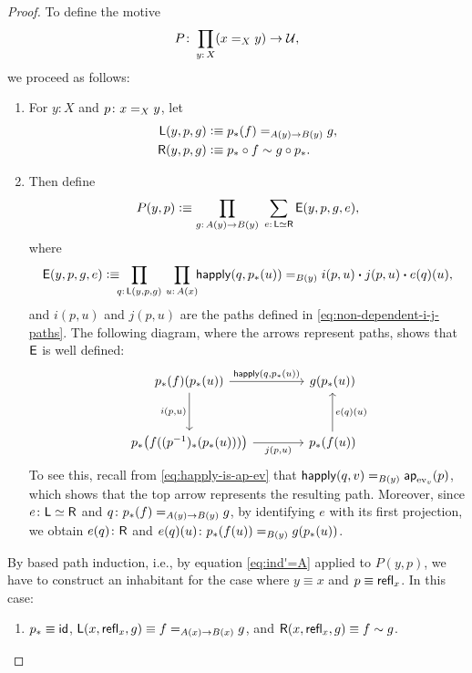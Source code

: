 \begin{proof}
    To define the motive
    \[
        P\colon\prod_{y\colon X}(x\eq Xy)\to\univ,
    \]
    we proceed as follows:
    \begin{enumerate}[-]
        \item For $y\colon X$ and $p\colon x\eq Xy$, let
        \begin{align*}
            \mathsf{L}(y,p,g)
                &\mathrel{\vcentcolon}\equiv p_*(f)\mathrel{=_{A(y)\to B(y)}}g,\\
            \mathsf{R}(y,p,g)
                &\mathrel{\vcentcolon}\equiv p_*\circ f\sim g\circ p_*.
        \end{align*}

        \item Then define
        \[
            P(y,p)\defeq\prod_{g\colon A(y)\to B(y)}
                \;\sum_{e\colon \fun L\simeq\fun R}
                \fun E(y,p,g,e),
        \]
        where
        \[
            \fun E(y,p,g,e)\defeq\!\!\!
                \prod_{q\colon\fun L(y,p,g)}
                \,\prod_{u\colon A(x)}
                    \!\!\fun{happly}(q,p_*(u))
                    \eq{B(y)}
                    i(p,u)\ct j(p, u)\ct e(q)(u),
        \]
        and $i(p,u)$ and $j(p,u)$ are the paths defined in \eqref{eq:non-dependent-i-j-paths}. The following diagram, where the arrows represent paths, shows that $\mathsf{E}$ is well defined:
        \[
            \begin{tikzcd}[column sep=4em, row sep=3em]
                p_*(f)(p_*(u))
                        \arrow[r,"{\fun{happly}(q, p_*(u))}"]
                        \arrow[d,"{i(p,u)}"']
                    &g(p_*(u))\\
                {p_*\bigl(f((p^{-1})_*(p_*(u)))\bigr)}
                        \arrow[r,"{j(p,u)}"']
                    &{p_*(f(u))}
                        \arrow[u,"e(q)(u)"']
            \end{tikzcd}
        \]
        To see this, recall from \eqref{eq:happly-is-ap-ev} that $\mathsf{happly}(q,v)\mathrel{=_{B(y)}}\mathsf{ap}_{{\operatorname{ev}}_{v}}(p)$, which shows that the top arrow represents the resulting path. Moreover, since $e\colon\fun L\simeq\fun R$ and $q\colon p_*(f)\eq{A(y)\to B(y)}g$, by identifying $e$ with its first projection, we obtain $e(q)\colon\fun R$ and $e(q)(u)\colon p_*(f(u))\eq{B(y)}g(p_*(u))$.
    \end{enumerate}
    By based path induction, i.e., by equation \eqref{eq:ind'=A} applied to $P(y,p)$, we have to construct an inhabitant for the case where $y\equiv x$ and $p\equiv\mathsf{refl}_x$. In this case:
    \begin{enumerate}[-]
        \item $p_*\equiv\mathsf{id}$, $\mathsf{L}(x,\mathsf{refl}_x,g)\equiv f\mathrel{=_{A(x)\to B(x)}}g$, and $\mathsf{R}(x,\mathsf{refl}_x,g)\equiv f\sim g$.


\end{enumerate}
\end{proof}
